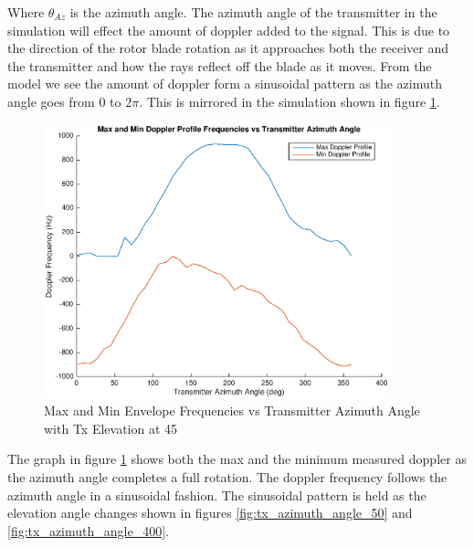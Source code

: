Where $\theta_{Az}$ is the azimuth angle. The azimuth angle of the transmitter in the simulation will effect the amount of doppler added to the signal. This is due to the direction of the rotor blade rotation as it approaches both the receiver and the transmitter and how the rays reflect off the blade as it moves. From the model we see the amount of doppler form a sinusoidal pattern as the azimuth angle goes from $0$ to $2\pi$. This is mirrored in the simulation shown in figure \ref{fig:tx_azimuth_angle_200}.

\begin{figure}
	\begin{center}
		\includegraphics[width=10cm]{images/simulation/Azimuth_angle_200_max_doppler.eps}
		\caption{Max and Min Envelope Frequencies vs Transmitter Azimuth Angle with Tx Elevation at 45\textdegree}
		\label{fig:tx_azimuth_angle_200}
	\end{center}
\end{figure}

The graph in figure \ref{fig:tx_azimuth_angle_200} shows both the max and the minimum measured doppler as the azimuth angle completes a full rotation. The doppler frequency follows the azimuth angle in a sinusoidal fashion. The sinusoidal pattern is held as the elevation angle changes shown in figures \ref{fig:tx_azimuth_angle_50} and \ref{fig:tx_azimuth_angle_400}.


